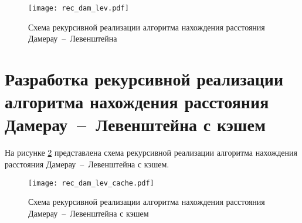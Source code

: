 \begin{figure}[h!]
    \centering
    \texttt{[image: rec\_dam\_lev.pdf]}
    \caption{Схема рекурсивной реализации алгоритма нахождения расстояния Дамерау~--~Левенштейна}
    \label{img:rec_dam_lev}
\end{figure}

\section{Разработка рекурсивной реализации алгоритма нахождения расстояния Дамерау~--~Левенштейна с кэшем}
На рисунке \ref{img:rec_dam_lev_cache} представлена схема рекурсивной реализации алгоритма нахождения расстояния Дамерау~--~Левенштейна с кэшем.

\begin{figure}[h!]
    \centering
    \texttt{[image: rec\_dam\_lev\_cache.pdf]}
    \caption{Схема рекурсивной реализации алгоритма нахождения расстояния Дамерау~--~Левенштейна с кэшем}
    \label{img:rec_dam_lev_cache}
\end{figure}

\newpage